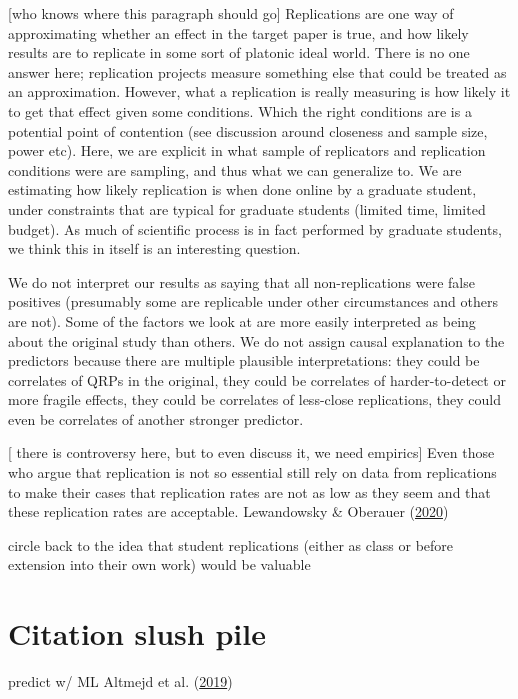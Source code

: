 \documentclass[
  english,
  a4paper,
]{article}
\begin{document}
{[}who knows where this paragraph should go{]} Replications are one way of approximating whether an effect in the target paper is true, and how likely results are to replicate in some sort of platonic ideal world. There is no one answer here; replication projects measure something else that could be treated as an approximation. However, what a replication is really measuring is how likely it to get that effect given some conditions. Which the right conditions are is a potential point of contention (see discussion around closeness and sample size, power etc). Here, we are explicit in what sample of replicators and replication conditions were are sampling, and thus what we can generalize to. We are estimating how likely replication is when done online by a graduate student, under constraints that are typical for graduate students (limited time, limited budget). As much of scientific process is in fact performed by graduate students, we think this in itself is an interesting question.

We do not interpret our results as saying that all non-replications were false positives (presumably some are replicable under other circumstances and others are not). Some of the factors we look at are more easily interpreted as being about the original study than others. We do not assign causal explanation to the predictors because there are multiple plausible interpretations: they could be correlates of QRPs in the original, they could be correlates of harder-to-detect or more fragile effects, they could be correlates of less-close replications, they could even be correlates of another stronger predictor.

{[} there is controversy here, but to even discuss it, we need empirics{]} Even those who argue that replication is not so essential still rely on data from replications to make their cases that replication rates are not as low as they seem and that these replication rates are acceptable. Lewandowsky \& Oberauer (\protect\hyperlink{ref-lewandowsky2020}{2020})

circle back to the idea that student replications (either as class or before extension into their own work) would be valuable

\hypertarget{citation-slush-pile}{%
\section{Citation slush pile}\label{citation-slush-pile}}

predict w/ ML Altmejd et al. (\protect\hyperlink{ref-altmejd2019}{2019})
\end{document}
